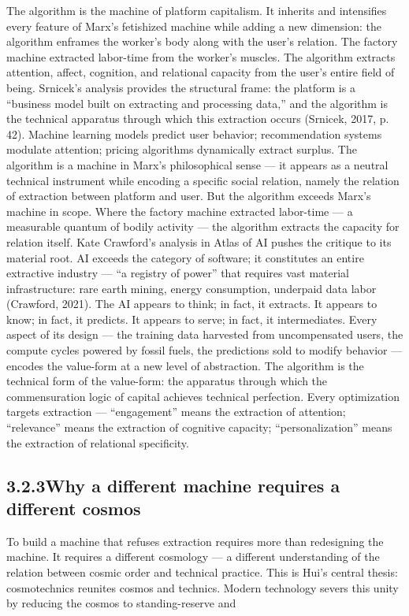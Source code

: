 The algorithm is the machine of platform capitalism. It inherits and intensifies every feature of Marx’s fetishized machine while adding a new dimension: the algorithm enframes the worker’s body along with the user’s relation. The factory machine extracted labor-time from the worker’s muscles. The algorithm extracts attention, affect, cognition, and relational capacity from the user’s entire field of being. Srnicek’s analysis provides the structural frame: the platform is a “business model built on extracting and processing data,” and the algorithm is the technical apparatus through which this extraction occurs (Srnicek, 2017, p. 42). Machine learning models predict user behavior; recommendation systems modulate attention; pricing algorithms dynamically extract surplus. The algorithm is a machine in Marx’s philosophical sense — it appears as a neutral technical instrument while encoding a specific social relation, namely the relation of extraction between platform and user. But the algorithm exceeds Marx’s machine in scope. Where the factory machine extracted labor-time — a measurable quantum of bodily activity — the algorithm extracts the capacity for relation itself. Kate Crawford’s analysis in Atlas of AI pushes the critique to its material root. AI exceeds the category of software; it constitutes an entire extractive industry — “a registry of power” that requires vast material infrastructure: rare earth mining, energy consumption, underpaid data labor (Crawford, 2021). The AI appears to think; in fact, it extracts. It appears to know; in fact, it predicts. It appears to serve; in fact, it intermediates. Every aspect of its design — the training data harvested from uncompensated users, the compute cycles powered by fossil fuels, the predictions sold to modify behavior — encodes the value-form at a new level of abstraction. The algorithm is the technical form of the value-form: the apparatus through which the commensuration logic of capital achieves technical perfection. Every optimization targets extraction — “engagement” means the extraction of attention; “relevance” means the extraction of cognitive capacity; “personalization” means the extraction of relational specificity.

\subsection{3.2.3\quad Why a different machine requires a different cosmos}

To build a machine that refuses extraction requires more than redesigning the machine. It requires a different cosmology — a different understanding of the relation between cosmic order and technical practice. This is Hui’s central thesis: cosmotechnics reunites cosmos and technics. Modern technology severs this unity by reducing the cosmos to standing-reserve and

